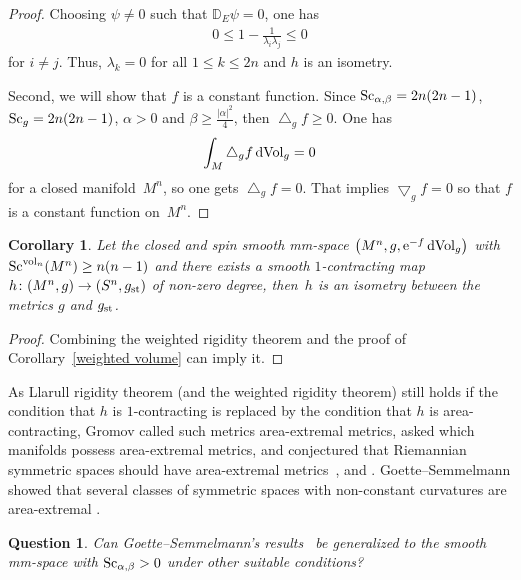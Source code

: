 \documentclass[10pt,a4paper]{amsart}
\newtheorem{Question}[Theorem]{Question}
\newtheorem{Corollary}[Theorem]{Corollary}
\begin{document}
\begin{proof}
Choosing $\psi\neq 0$ such that ${\mathbb D}_E\psi=0$, one has
\begin{align*}
0\leq 1-\frac{1}{\lambda_i\lambda_j}\leq 0
\end{align*}
for $i\neq j$. Thus, $\lambda_k=0$ for all $1\leq k\leq 2n$ and $h$ is an isometry.

Second, we will show that $f$ is a constant function. Since ${\rm Sc}_{\alpha, \beta}=2n(2n-1)$, ${\rm Sc}_g=2n(2n-1)$, $\alpha> 0$ and $\beta \geq \frac{|\alpha|^2}{4}$,
then $\bigtriangleup_g f\geq 0$. One has
\begin{align*}
 \int_M \bigtriangleup_g f \,{\rm dVol}_g=0
\end{align*}
for a closed manifold~$M^n$, so one gets $\bigtriangleup_g f=0$. That implies $\bigtriangledown_gf=0$ so that $f$ is a constant function on~$M^n$.
\end{proof}

\begin{Corollary}Let the closed and spin smooth mm-space $\big(M^n,g, {\rm e}^{-f}\,{\rm dVol}_{g}\big)$ with ${\rm Sc}^{{\rm vol}_n}(M^n)\allowbreak \geq n(n-1)$ and there exists a smooth $1$-contracting map $h\colon (M^n, g)\to (S^n, g_{\rm st})$ of non-zero degree, then~$h$ is an isometry between the metrics $g$ and $g_{\rm st}$.
\end{Corollary}

\begin{proof}Combining the weighted rigidity theorem and the proof of Corollary~\ref{weighted volume} can imply it.
\end{proof}

As Llarull rigidity theorem (and the weighted rigidity theorem) still holds if the condition that $h$ is $1$-contracting is replaced by the condition that $h$ is area-contracting, Gromov called such metrics area-extremal metrics, asked which manifolds possess area-extremal metrics, and conjectured that Riemannian symmetric spaces should have area-extremal metrics~\cite{MR1389019}, \cite[Section~17]{Gromov} and \cite[Section~4.2]{2019arXiv190810612G}. Goette--Semmelmann showed that several classes of symmetric spaces with non-constant curvatures are area-extremal \cite{MR1877585}.

\begin{Question}Can Goette--Semmelmann's results~{\rm \cite{MR1877585}} be generalized to the smooth mm-space with ${\rm Sc}_{\alpha, \beta}>0$ under other suitable conditions?
\end{Question}
\end{document}
